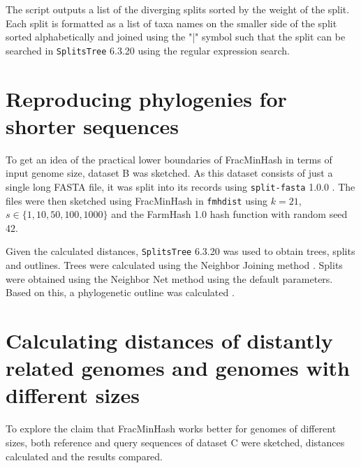 The script outputs a list of the diverging splits sorted by the weight of the
split. Each split is formatted as a list of taxa names on the smaller side of
the split sorted alphabetically and joined using the "|" symbol such that the
split can be searched in \texttt{SplitsTree} 6.3.20 using the regular expression
search.



\section{Reproducing phylogenies for shorter sequences}
To get an idea of the practical lower boundaries of FracMinHash in terms of
input genome size, dataset B was sketched. As this dataset consists of just a
single long FASTA file, it was split into its records using \texttt{split-fasta}
1.0.0 \cite{vashishtSplitfasta2020}. The files were then sketched using
FracMinHash
\cite{irberLightweightCompositionalAnalysis2022,heraDerivingConfidenceIntervals2023}
in \texttt{fmhdist} using $k=21$, $s \in \{1, 10, 50, 100, 1000\}$ and the
FarmHash 1.0 hash function \cite{pikeFarmhash2014,ZeroAllocationHashing2022}
with random seed 42.

Given the calculated distances, \texttt{SplitsTree} 6.3.20
\cite{husonApplicationPhylogeneticNetworks2006} was used to obtain trees, splits
and outlines. Trees were calculated using the Neighbor Joining method
\cite{saitouNeighborjoiningMethodNew1987}. Splits were obtained using the
Neighbor Net method
\cite{bryantNeighborNetAgglomerativeMethod2004,bryantNeighborNetImprovedAlgorithms2023}
using the default parameters. Based on this, a phylogenetic outline was
calculated \cite{bagciMicrobialPhylogeneticContext2021}.


\section{Calculating distances of distantly related genomes and genomes with different sizes}
To explore the claim that FracMinHash works better for genomes of different
sizes, both reference and query sequences of dataset C were sketched, distances
calculated and the results compared. 

